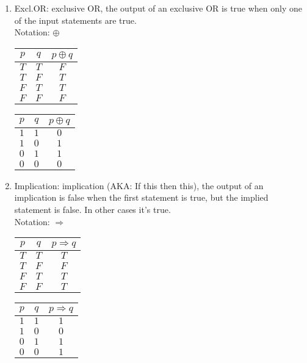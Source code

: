 \documentclass{article}
\begin{document}
\begin{enumerate}[label=Def. \arabic*:, leftmargin=3.5em, align=left]
  \item Excl.OR: exclusive OR, the output of an exclusive OR is true when only one of the input statements are true.\\
  Notation: $\oplus$
  \begin{center}
    \begin{tabular}{cc|c}
      $p$ & $q$ & $p \oplus q$ \\ \hline 
      $T$ & $T$ & $F$ \\
      $T$ & $F$ & $T$ \\
      $F$ & $T$ & $T$ \\
      $F$ & $F$ & $F$ \\
    \end{tabular} \qquad
    \begin{tabular}{cc|c}
      $p$ & $q$ & $p \oplus q$ \\ \hline 
      $1$ & $1$ & $0$ \\
      $1$ & $0$ & $1$ \\
      $0$ & $1$ & $1$ \\
      $0$ & $0$ & $0$ \\
    \end{tabular}
  \end{center}

  \item Implication: implication (AKA: If this then this), the output of an implication is false when the first statement is true, but the implied statement is false. In other cases it's true.\\
  Notation: $\Rightarrow$
  \begin{center}
    \begin{tabular}{cc|c}
      $p$ & $q$ & $p \Rightarrow q$ \\ \hline 
      $T$ & $T$ & $T$ \\
      $T$ & $F$ & $F$ \\
      $F$ & $T$ & $T$ \\
      $F$ & $F$ & $T$ \\
    \end{tabular} \qquad
    \begin{tabular}{cc|c}
      $p$ & $q$ & $p \Rightarrow q$ \\ \hline 
      $1$ & $1$ & $1$ \\
      $1$ & $0$ & $0$ \\
      $0$ & $1$ & $1$ \\
      $0$ & $0$ & $1$ \\
    \end{tabular}
  \end{center}
  

\end{enumerate}
\end{document}
